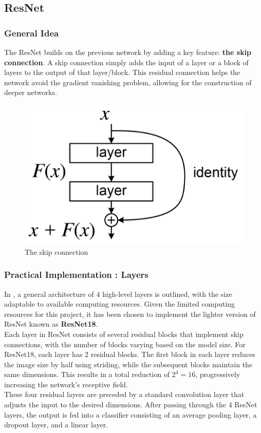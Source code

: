 \documentclass[twocolumn,superscriptaddress,aps]{revtex4-1}
\begin{document}
\subsection{ResNet}

\subsubsection{General Idea}
The ResNet builds on the previous network by adding a key feature: \textbf{the skip connection}. A skip connection simply adds the input of a layer or a block of layers to the output of that layer/block. This residual connection helps the network avoid the gradient vanishing problem, allowing for the construction of deeper networks.

\begin{figure}[hbtp]
    \centering
    \includegraphics[width = 0.25 \textwidth]{images/skip_connection.png}
    \caption{The skip connection}
    \label{fig:skip_connection}
\end{figure}

\subsubsection{Practical Implementation : Layers}

In \cite{resnet}, a general architecture of 4 high-level layers is outlined, with the size adaptable to available computing resources. Given the limited computing resources for this project, it has been chosen to implement the lighter version of ResNet known as \textbf{ResNet18}. \\

Each layer in ResNet consists of several residual blocks that implement skip connections, with the number of blocks varying based on the model size. For ResNet18, each layer has 2 residual blocks. The first block in each layer reduces the image size by half using striding, while the subsequent blocks maintain the same dimensions. This results in a total reduction of 
$2^4 = 16$, progressively increasing the network's receptive field. \\

These four residual layers are preceded by a standard convolution layer that adjusts the input to the desired dimensions. After passing through the 4 ResNet layers, the output is fed into a classifier consisting of an average pooling layer, a dropout layer, and a linear layer.\\
\end{document}
